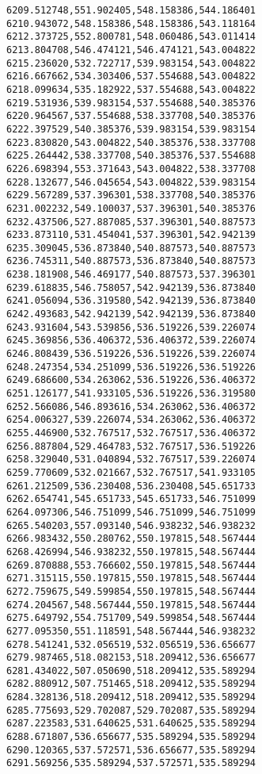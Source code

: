 \documentclass[11pt]{article}
\begin{document}
\begin{Verbatim}[commandchars=\\\{\}]
6209.512748,551.902405,548.158386,544.186401
6210.943072,548.158386,548.158386,543.118164
6212.373725,552.800781,548.060486,543.011414
6213.804708,546.474121,546.474121,543.004822
6215.236020,532.722717,539.983154,543.004822
6216.667662,534.303406,537.554688,543.004822
6218.099634,535.182922,537.554688,543.004822
6219.531936,539.983154,537.554688,540.385376
6220.964567,537.554688,538.337708,540.385376
6222.397529,540.385376,539.983154,539.983154
6223.830820,543.004822,540.385376,538.337708
6225.264442,538.337708,540.385376,537.554688
6226.698394,553.371643,543.004822,538.337708
6228.132677,546.045654,543.004822,539.983154
6229.567289,537.396301,538.337708,540.385376
6231.002232,549.100037,537.396301,540.385376
6232.437506,527.887085,537.396301,540.887573
6233.873110,531.454041,537.396301,542.942139
6235.309045,536.873840,540.887573,540.887573
6236.745311,540.887573,536.873840,540.887573
6238.181908,546.469177,540.887573,537.396301
6239.618835,546.758057,542.942139,536.873840
6241.056094,536.319580,542.942139,536.873840
6242.493683,542.942139,542.942139,536.873840
6243.931604,543.539856,536.519226,539.226074
6245.369856,536.406372,536.406372,539.226074
6246.808439,536.519226,536.519226,539.226074
6248.247354,534.251099,536.519226,536.519226
6249.686600,534.263062,536.519226,536.406372
6251.126177,541.933105,536.519226,536.319580
6252.566086,546.893616,534.263062,536.406372
6254.006327,539.226074,534.263062,536.406372
6255.446900,532.767517,532.767517,536.406372
6256.887804,529.464783,532.767517,536.519226
6258.329040,531.040894,532.767517,539.226074
6259.770609,532.021667,532.767517,541.933105
6261.212509,536.230408,536.230408,545.651733
6262.654741,545.651733,545.651733,546.751099
6264.097306,546.751099,546.751099,546.751099
6265.540203,557.093140,546.938232,546.938232
6266.983432,550.280762,550.197815,548.567444
6268.426994,546.938232,550.197815,548.567444
6269.870888,553.766602,550.197815,548.567444
6271.315115,550.197815,550.197815,548.567444
6272.759675,549.599854,550.197815,548.567444
6274.204567,548.567444,550.197815,548.567444
6275.649792,554.751709,549.599854,548.567444
6277.095350,551.118591,548.567444,546.938232
6278.541241,532.056519,532.056519,536.656677
6279.987465,518.082153,518.209412,536.656677
6281.434022,507.050690,518.209412,535.589294
6282.880912,507.751465,518.209412,535.589294
6284.328136,518.209412,518.209412,535.589294
6285.775693,529.702087,529.702087,535.589294
6287.223583,531.640625,531.640625,535.589294
6288.671807,536.656677,535.589294,535.589294
6290.120365,537.572571,536.656677,535.589294
6291.569256,535.589294,537.572571,535.589294

\end{Verbatim}
\end{document}
